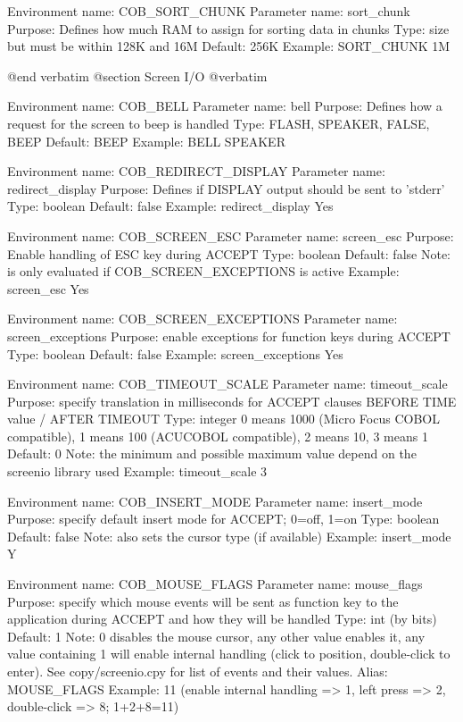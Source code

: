 Environment name:  COB_SORT_CHUNK
  Parameter name:  sort_chunk
         Purpose:  Defines how much RAM to assign for sorting data in chunks
            Type:  size  but must be within 128K and 16M
         Default:  256K
         Example:  SORT_CHUNK 1M


@end verbatim
@section Screen I/O
@verbatim


Environment name:  COB_BELL
  Parameter name:  bell
         Purpose:  Defines how a request for the screen to beep is handled
            Type:  FLASH, SPEAKER, FALSE, BEEP
         Default:  BEEP
         Example:  BELL SPEAKER

Environment name:  COB_REDIRECT_DISPLAY
  Parameter name:  redirect_display
         Purpose:  Defines if DISPLAY output should be sent to 'stderr'
            Type:  boolean
         Default:  false
         Example:  redirect_display Yes

Environment name:  COB_SCREEN_ESC
  Parameter name:  screen_esc
         Purpose:  Enable handling of ESC key during ACCEPT
            Type:  boolean
         Default:  false
            Note:  is only evaluated if COB_SCREEN_EXCEPTIONS is active
         Example:  screen_esc Yes

Environment name:  COB_SCREEN_EXCEPTIONS
  Parameter name:  screen_exceptions
         Purpose:  enable exceptions for function keys during ACCEPT
            Type:  boolean
         Default:  false
         Example:  screen_exceptions Yes

Environment name:  COB_TIMEOUT_SCALE
  Parameter name:  timeout_scale
         Purpose:  specify translation in milliseconds for ACCEPT clauses
                   BEFORE TIME value / AFTER TIMEOUT
            Type:  integer
                   0 means 1000 (Micro Focus COBOL compatible), 1 means 100
                   (ACUCOBOL compatible), 2 means 10, 3 means 1
         Default:  0
            Note:  the minimum and possible maximum value depend on the
                   screenio library used
         Example:  timeout_scale 3

Environment name:  COB_INSERT_MODE
  Parameter name:  insert_mode
         Purpose:  specify default insert mode for ACCEPT; 0=off, 1=on
            Type:  boolean
         Default:  false
            Note:  also sets the cursor type (if available)
         Example:  insert_mode Y

Environment name:  COB_MOUSE_FLAGS
  Parameter name:  mouse_flags
         Purpose:  specify which mouse events will be sent as function key
                   to the application during ACCEPT and how they will be
                   handled
            Type:  int (by bits)
         Default:  1
            Note:  0 disables the mouse cursor, any other value enables it,
                   any value containing 1 will enable internal handling (click
                   to position, double-click to enter).
                   See copy/screenio.cpy for list of events and their values.
           Alias:  MOUSE_FLAGS
         Example:  11 (enable internal handling => 1, left press => 2,
                       double-click => 8; 1+2+8=11)

